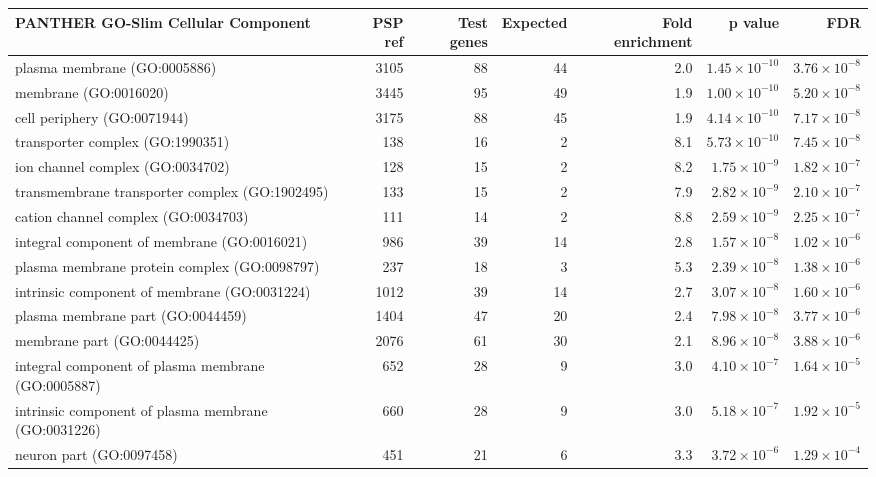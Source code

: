 \begin{table}[ht]
\centering
\begin{adjustbox}{width=\textwidth}

\begin{tabular}{lrrrrrr}
  \hline
PANTHER GO-Slim Cellular Component & PSP ref & Test genes & Expected & Fold enrichment & p value & FDR \\ 
  \hline
plasma membrane (GO:0005886) & 3105 & 88 & 44 & 2.0 & $1.45 \times 10^{-10}$ & $3.76 \times 10^{-8}$ \\ 
  membrane (GO:0016020) & 3445 & 95 & 49 & 1.9 & $1.00 \times 10^{-10}$ & $5.20 \times 10^{-8}$ \\ 
  cell periphery (GO:0071944) & 3175 & 88 & 45 & 1.9 & $4.14 \times 10^{-10}$ & $7.17 \times 10^{-8}$ \\ 
  transporter complex (GO:1990351) & 138 & 16 & 2 & 8.1 & $5.73 \times 10^{-10}$ & $7.45 \times 10^{-8}$ \\ 
  ion channel complex (GO:0034702) & 128 & 15 & 2 & 8.2 & $1.75 \times 10^{-9}$ & $1.82 \times 10^{-7}$ \\ 
  transmembrane transporter complex (GO:1902495) & 133 & 15 & 2 & 7.9 & $2.82 \times 10^{-9}$ & $2.10 \times 10^{-7}$ \\ 
  cation channel complex (GO:0034703) & 111 & 14 & 2 & 8.8 & $2.59 \times 10^{-9}$ & $2.25 \times 10^{-7}$ \\ 
  integral component of membrane (GO:0016021) & 986 & 39 & 14 & 2.8 & $1.57 \times 10^{-8}$ & $1.02 \times 10^{-6}$ \\ 
  plasma membrane protein complex (GO:0098797) & 237 & 18 & 3 & 5.3 & $2.39 \times 10^{-8}$ & $1.38 \times 10^{-6}$ \\ 
  intrinsic component of membrane (GO:0031224) & 1012 & 39 & 14 & 2.7 & $3.07 \times 10^{-8}$ & $1.60 \times 10^{-6}$ \\ 
  plasma membrane part (GO:0044459) & 1404 & 47 & 20 & 2.4 & $7.98 \times 10^{-8}$ & $3.77 \times 10^{-6}$ \\ 
  membrane part (GO:0044425) & 2076 & 61 & 30 & 2.1 & $8.96 \times 10^{-8}$ & $3.88 \times 10^{-6}$ \\ 
  integral component of plasma membrane (GO:0005887) & 652 & 28 & 9 & 3.0 & $4.10 \times 10^{-7}$ & $1.64 \times 10^{-5}$ \\ 
  intrinsic component of plasma membrane (GO:0031226) & 660 & 28 & 9 & 3.0 & $5.18 \times 10^{-7}$ & $1.92 \times 10^{-5}$ \\ 
  neuron part (GO:0097458) & 451 & 21 & 6 & 3.3 & $3.72 \times 10^{-6}$ & $1.29 \times 10^{-4}$ \\ 

\end{tabular}
\end{adjustbox}
\end{table}
